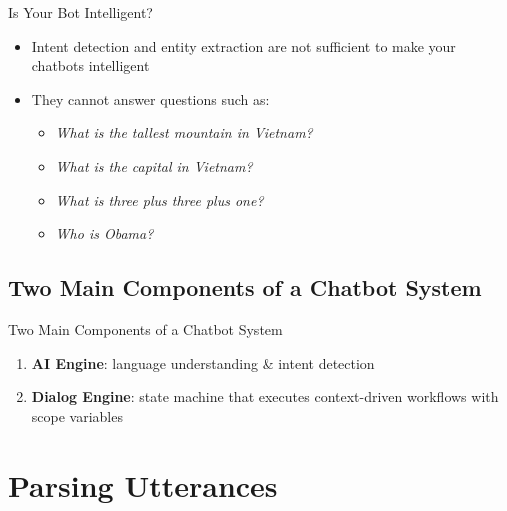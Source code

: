 \documentclass{beamer}
\begin{document}
\begin{frame}{Is Your Bot Intelligent?}
    \begin{itemize}
        \item Intent detection and entity extraction are not sufficient to make your chatbots intelligent
        \pause
        \item They cannot answer questions such as:
        \begin{itemize}
            \item \textit{What is the tallest mountain in Vietnam?}
            \item \textit{What is the capital in Vietnam?}
            \item \textit{What is three plus three plus one?}
            \item \textit{Who is Obama?}
        \end{itemize}
    \end{itemize}
\end{frame}

\subsection{Two Main Components of a Chatbot System}

\begin{frame}{Two Main Components of a Chatbot System}
    \begin{enumerate}
        \item \textbf{AI Engine}: language understanding \& intent detection
        \item \textbf{Dialog Engine}: state machine that executes context-driven workflows with scope variables
    \end{enumerate}
\end{frame}


\section{Parsing Utterances}
\end{document}
